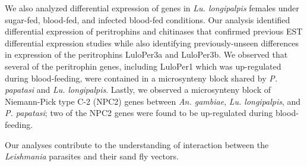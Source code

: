 We also analyzed differential expression of genes in \emph{Lu. longipalpis} females under sugar-fed, blood-fed, and infected blood-fed conditions.  Our analysis identified differential expression of peritrophins and chitinases that confirmed previous EST differential expression studies while also identifying previously-unseen differences in expression of the peritrophins LuloPer3a and LuloPer3b. We observed that several of the peritrophin genes, including LuloPer1 which was up-regulated during blood-feeding, were contained in a microsynteny block shared by \emph{P. papatasi} and \emph{Lu. longipalpis}.  Lastly, we observed a microsynteny block of Niemann-Pick type C-2 (NPC2) genes between \emph{An. gambiae}, \emph{Lu. longipalpis}, and \emph{P. papatasi}; two of the NPC2 genes were found to be up-regulated during blood-feeding.

Our analyses contribute to the understanding of interaction between the \emph{Leishmania} parasites and their sand fly vectors.




